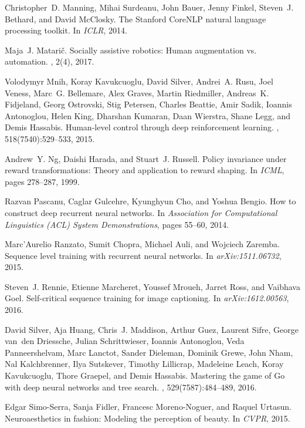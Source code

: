 \documentclass{article}
\begin{document}
\begin{thebibliography}{10}
Christopher~D. Manning, Mihai Surdeanu, John Bauer, Jenny Finkel, Steven~J.
  Bethard, and David McClosky.
\newblock The {Stanford} {CoreNLP} natural language processing toolkit.
\newblock In {\em ICLR}, 2014.

Maja~J. Matari\v{c}.
\newblock Socially assistive robotics: Human augmentation vs. automation.
, 2(4), 2017.

Volodymyr Mnih, Koray Kavukcuoglu, David Silver, Andrei~A. Rusu, Joel Veness,
  Marc~G. Bellemare, Alex Graves, Martin Riedmiller, Andreas~K. Fidjeland,
  Georg Ostrovski, Stig Petersen, Charles Beattie, Amir Sadik, Ioannis
  Antonoglou, Helen King, Dharshan Kumaran, Daan Wierstra, Shane Legg, and
  Demis Hassabis.
\newblock Human-level control through deep reinforcement learning.
, 518(7540):529--533, 2015.

Andrew~Y. Ng, Daishi Harada, and Stuart~J. Russell.
\newblock Policy invariance under reward transformations: Theory and
  application to reward shaping.
\newblock In {\em ICML}, pages 278--287, 1999.

Razvan Pascanu, Caglar Gulcehre, Kyunghyun Cho, and Yoshua Bengio.
\newblock How to construct deep recurrent neural networks.
\newblock In {\em Association for Computational Linguistics (ACL) System
  Demonstrations}, pages 55--60, 2014.

Marc'Aurelio Ranzato, Sumit Chopra, Michael Auli, and Wojciech Zaremba.
\newblock Sequence level training with recurrent neural networks.
\newblock In {\em arXiv:1511.06732}, 2015.

Steven~J. Rennie, Etienne Marcheret, Youssef Mroueh, Jarret Ross, and Vaibhava
  Goel.
\newblock Self-critical sequence training for image captioning.
\newblock In {\em arXiv:1612.00563}, 2016.

David Silver, Aja Huang, Chris~J. Maddison, Arthur Guez, Laurent Sifre, George
  van~den Driessche, Julian Schrittwieser, Ioannis Antonoglou, Veda
  Panneershelvam, Marc Lanctot, Sander Dieleman, Dominik Grewe, John Nham, Nal
  Kalchbrenner, Ilya Sutskever, Timothy Lillicrap, Madeleine Leach, Koray
  Kavukcuoglu, Thore Graepel, and Demis Hassabis.
\newblock Mastering the game of {Go} with deep neural networks and tree search.
, 529(7587):484--489, 2016.

Edgar Simo-Serra, Sanja Fidler, Francesc Moreno-Noguer, and Raquel Urtasun.
\newblock Neuroaesthetics in fashion: Modeling the perception of beauty.
\newblock In {\em CVPR}, 2015.


\end{thebibliography}
\end{document}
